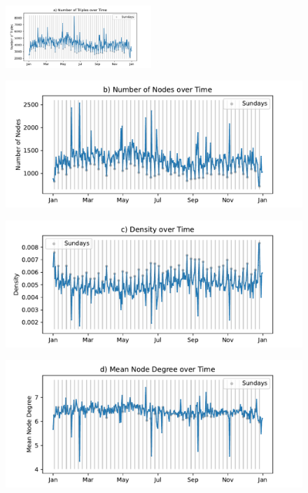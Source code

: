\begin{figure}[!t]
\begin{minipage}{\textwidth}
	\centering
	\includegraphics[width=0.49\textwidth]{figs/acled_subset_gta_aggregatedNumber of Triples.pdf}\\
\end{minipage}
\begin{minipage}{0.49\textwidth}
	\centering
	\includegraphics[width=\textwidth]{figs/acled_subset_gta_aggregatedNumber of Nodes.pdf}\\
\end{minipage}
\hfill
\begin{minipage}{0.49\textwidth}
	\centering
	\includegraphics[width=\textwidth]{figs/acled_subset_gta_aggregatedDensity.pdf}\\
\end{minipage}
\begin{minipage}{0.49\textwidth}
	\centering
	\includegraphics[width=\textwidth]{figs/acled_subset_gta_aggregatedMean Node Degree.pdf}\\

\end{minipage}
\end{figure}
